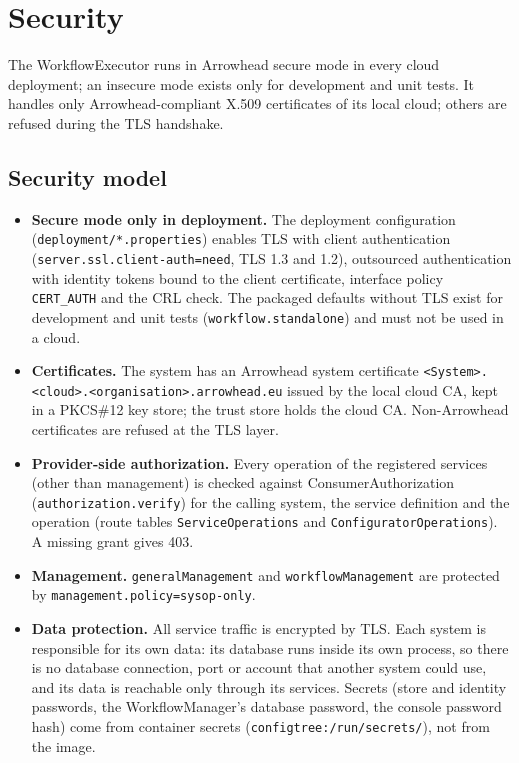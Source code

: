 \documentclass[a4paper]{arrowhead}
\begin{document}
\newpage
\section{Security}
\label{sec:security}
The WorkflowExecutor runs in Arrowhead secure mode in every cloud deployment; an insecure mode exists only for development and
unit tests. It handles only Arrowhead-compliant X.509 certificates of its local cloud; others are refused during the
TLS handshake.

\subsection{Security model}
\begin{itemize}
\item \textbf{Secure mode only in deployment.} The deployment configuration (\texttt{deployment/\allowbreak{}*.\allowbreak{}properties}) enables
TLS with client authentication (\texttt{server.\allowbreak{}ssl.\allowbreak{}client-\allowbreak{}auth=\allowbreak{}need}, TLS 1.3 and 1.2), outsourced authentication with
identity tokens bound to the client certificate, interface policy \texttt{CERT\_AUTH} and the CRL check. The packaged
defaults without TLS exist for development and unit tests (\texttt{workflow.\allowbreak{}standalone}) and must not be used in a
cloud.
\item \textbf{Certificates.} The system has an Arrowhead system certificate
\texttt{<System>.\allowbreak{}<cloud>.\allowbreak{}<organisation>.\allowbreak{}arrowhead.\allowbreak{}eu} issued by the local cloud CA, kept in a PKCS\#12 key store; the
trust store holds the cloud CA. Non-Arrowhead certificates are refused at the TLS layer.
\item \textbf{Provider-side authorization.} Every operation of the registered services (other than management) is
checked against ConsumerAuthorization (\texttt{authorization.\allowbreak{}verify}) for the calling system, the service definition
and the operation (route tables \texttt{Service\allowbreak{}Operations} and \texttt{Configurator\allowbreak{}Operations}). A missing grant gives
403.
\item \textbf{Management.} \texttt{general\allowbreak{}Management} and \texttt{workflow\allowbreak{}Management} are protected by
\texttt{management.\allowbreak{}policy=\allowbreak{}sysop-\allowbreak{}only}.
\item \textbf{Data protection.} All service traffic is encrypted by TLS. Each system is responsible for its own data:
its database runs inside its own process, so there is no database connection, port or account that another system could
use, and its data is reachable only through its services. Secrets (store and identity passwords, the WorkflowManager's
database password, the console password hash) come from container secrets (\texttt{configtree:/\allowbreak{}run/\allowbreak{}secrets/}), not from
the image.
\end{itemize}
\end{document}
